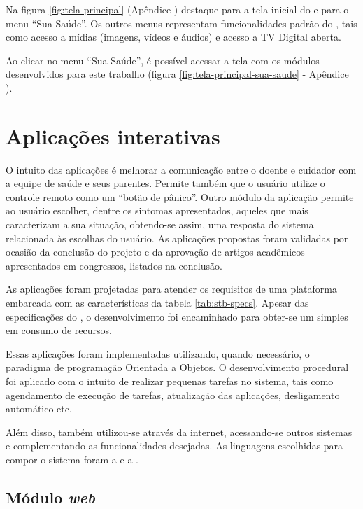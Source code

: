 Na figura \ref{fig:tela-principal} (Apêndice )
destaque para a tela inicial do \software[] \xbmc[] e para o menu ``Sua
Saúde''.  Os outros menus representam funcionalidades padrão do \software[] \xbmc, 
tais como acesso a mídias (imagens, vídeos e áudios) e acesso a TV
Digital aberta.

Ao clicar no menu ``Sua Saúde'', é possível acessar a tela com os módulos desenvolvidos
para este trabalho (figura \ref{fig:tela-principal-sua-saude} - Apêndice 
).

\section{Aplicações interativas} \label{subsec:aplicacoes-tv-health}

O intuito das aplicações é melhorar a comunicação entre o doente e cuidador com
a equipe de saúde e seus parentes. Permite também que o usuário utilize o
controle remoto como um ``botão de pânico''. Outro módulo da aplicação permite
ao usuário escolher, dentre os sintomas apresentados, aqueles que mais
caracterizam a sua situação, obtendo-se assim, uma resposta do sistema
relacionada às escolhas do usuário. As aplicações  propostas foram validadas
por ocasião da conclusão do projeto \nextsaude[] e da aprovação de artigos
acadêmicos apresentados em congressos, listados na conclusão.

As aplicações foram projetadas para atender os requisitos de uma plataforma
embarcada com as características da tabela \ref{tab:stb-specs}. Apesar 
das especificações do \hardware[], o desenvolvimento foi encaminhado para 
obter-se um \software[] simples em consumo de recursos.

Essas aplicações foram implementadas utilizando, quando necessário, o paradigma
de programação Orientada a Objetos. O desenvolvimento procedural foi aplicado
com o intuito de realizar pequenas tarefas no sistema, tais como agendamento
de execução de tarefas, atualização das aplicações, desligamento automático etc.

Além disso, também utilizou-se \webservices[] através da internet, acessando-se
outros sistemas e complementando as funcionalidades desejadas. As linguagens
escolhidas para compor o sistema foram a \python[] e a \shell.

\subsection{Módulo \textit{web}}

